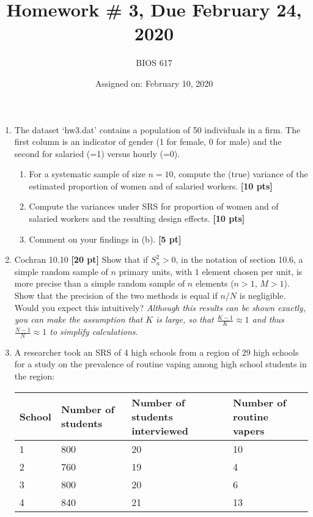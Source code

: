 \documentclass[12pt]{article}
\begin{document}
\title{Homework \# 3, Due February 24, 2020}
\author{BIOS 617}
\date{Assigned on: February 10, 2020}

\maketitle

\begin{enumerate}
\setlength{\itemsep}{15pt}%
\setlength{\parskip}{15pt}%

\item  The dataset `hw3.dat' contains a population of 50 individuals in a firm. The first column is an indicator of gender (1 for female, 0 for male) and the second for salaried (=1) versus hourly (=0).
	\begin{enumerate}
	\item For a systematic sample of size $n=10$, compute the (true) variance of the estimated proportion of women and of salaried workers. {\bf [10 pts]}
	\item Compute the variances under SRS for proportion of women and of salaried workers and the resulting design effects. {\bf [10 pts]}
	\item Comment on your findings in (b). {\bf [5 pt]}
	\end{enumerate}

\item Cochran 10.10 {\bf [20 pt]} Show that if $S_u^2 >0$, in the notation of section 10.6, a simple random sample of $n$ primary units, with $1$ element chosen per unit, is more precise than a simple random sample of $n$ elements ($n>1$, $M>1$). Show that the precision of the two methods is equal if $n/N$ is negligible. Would you expect this intuitively? \emph{Although this results can be shown exactly, you can make the assumption that $K$ is large, so that $\frac{K-1}{K} \approx 1$ and thus $\frac{N-1}{N} \approx 1$ to simplify calculations.}

\item A researcher took an SRS of 4 high schools from a region of 29 high schools for a study on the prevalence of routine vaping among high school students in the region:

\begin{table}[!th]
\centering
\begin{tabular}{p{1in} | p{1.5in} p{1.5in} p{1.5in}}
School & Number of students & Number of students interviewed & Number of routine vapers \\ \hline
1 & 800 & 20 & 10 \\
2 & 760 & 19 & 4 \\
3 & 800 & 20 & 6 \\
4 & 840 & 21 & 13 \\ \hline
\end{tabular}
\end{table}

\end{enumerate}
\end{document}
